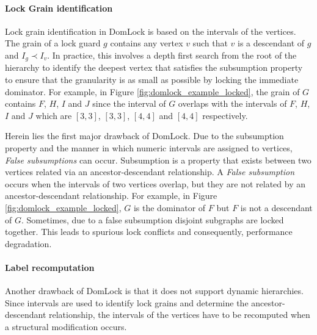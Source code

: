 \paragraph{Lock Grain identification}

Lock grain identification in DomLock is based on the intervals of the vertices. The grain of a lock guard $g$ contains any vertex $v$ such that $v$ is a descendant of $g$ and $I_g \prec I_v$. 
In practice, this involves a depth first search from the root of the hierarchy to identify the deepest vertex that satisfies the subsumption property to ensure that the granularity is as small as possible by locking the immediate dominator.
For example, in Figure \ref{fig:domlock_example_locked}, the grain of $G$ contains $F$, $H$, $I$ and $J$ since the interval of $G$ overlaps with the intervals of $F$, $H$, $I$ and $J$ which are $[3,3]$, $[3,3]$, $[4,4]$ and $[4,4]$ respectively.

Herein lies the first major drawback of DomLock. 
Due to the subsumption property and the manner in which numeric intervals are assigned to vertices, \emph{False subsumptions} can occur. 
Subsumption is a property that exists between two vertices related via an ancestor-descendant relationship. 
A \emph{False subsumption} occurs when the intervals of two vertices overlap, but they are not related by an ancestor-descendant relationship. 
For example, in Figure \ref{fig:domlock_example_locked}, $G$ is the dominator of $F$ but $F$ is not a descendant of $G$. 
Sometimes, due to a false subsumption disjoint subgraphs are locked together. 
This leads to spurious lock conflicts and consequently, performance degradation. 

\paragraph{Label recomputation}
Another drawback of DomLock is that it does not support dynamic hierarchies. 
Since intervals are used to identify lock grains and determine the ancestor-descendant relationship, the intervals of the vertices have to be recomputed when a structural modification occurs.

